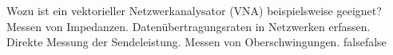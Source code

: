     {Wozu ist ein vektorieller Netzwerkanalysator (VNA) beispielsweise geeignet?}
    {Messen von Impedanzen.}
    {Datenübertragungsraten in Netzwerken erfassen.}
    {Direkte Messung der Sendeleistung.}
    {Messen von Oberschwingungen.}
    {false}{false}
